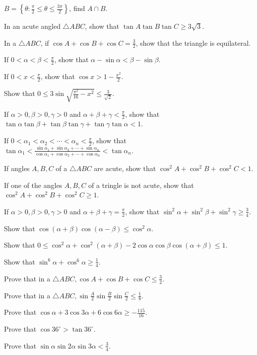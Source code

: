   $B = \left\{\theta: \frac{\pi}{2}\leq \theta\leq \frac{3\pi}{2}\right\}$, find $A\cap B$.
\item In an acute angled $\triangle ABC$, show that $\tan A\tan B\tan C\geq 3\sqrt{3}$.
\item In a $\triangle ABC$, if $\cos A + \cos B + \cos C = \frac{3}{2}$, show that the triangle is
  equilateral.
\item If $0 < \alpha < \beta < \frac{\pi}{2}$, show that $\alpha - \sin\alpha < \beta - \sin\beta$.
\item If $0 < x < \frac{\pi}{2}$, show that $\cos x > 1 - \frac{x^2}{2}$.
\item Show that $0\leq 3\sin\sqrt{\frac{\pi^2}{16} - x^2}\leq \frac{3}{\sqrt{2}}$.
\item If $\alpha > 0, \beta > 0, \gamma > 0$ and $\alpha + \beta + \gamma < \frac{\pi}{2}$, show that
  $\tan\alpha\tan\beta + \tan\beta\tan\gamma + \tan\gamma\tan\alpha < 1$.
\item If $0 < \alpha_1 < \alpha_2 < \cdots < \alpha_n < \frac{\pi}{2}$, show that $\tan\alpha_1
  < \frac{\sin\alpha_1 + \sin\alpha_2 + \cdots + \sin\alpha_n}{\cos\alpha_1 + \cos\alpha_2 + \cdots
    + \cos\alpha_n} < \tan\alpha_n$.
\item If angles $A, B, C$ of a $\triangle ABC$ are acute, show that $\cos^2A + \cos^2B + \cos^2C < 1$.
\item If one of the angles $A, B, C$ of a tringle is not acute, show that $\cos^2A + \cos^2B + \cos^2C \geq
  1$.
\item If $\alpha > 0, \beta > 0, \gamma > 0$ and $\alpha + \beta + \gamma = \frac{\pi}{2}$, show that
  $\sin^2\alpha + \sin^2\beta + \sin^2\gamma \geq \frac{3}{4}$.
\item Show that $\cos(\alpha + \beta)\cos(\alpha - \beta)\leq \cos^2\alpha$.
\item Show that $0\leq \cos^2\alpha + \cos^2(\alpha + \beta) - 2\cos\alpha\cos\beta\cos(\alpha + \beta) \leq
  1$.
\item Show that $\sin^6\alpha + \cos^6\alpha \geq \frac{1}{4}$.
\item Prove that in a $\triangle ABC, \cos A + \cos B + \cos C\leq \frac{3}{2}$.
\item Prove that in a $\triangle ABC, \sin\frac{A}{2}\sin\frac{B}{2}\sin\frac{C}{2}\leq \frac{1}{8}$.
\item Prove that $\cos\alpha + 3\cos3\alpha + 6\cos6\alpha\geq -\frac{115}{16}$.
\item Prove that $\cos36^\circ > \tan36^\circ$.
\item Prove that $\sin\alpha\sin2\alpha\sin3\alpha < \frac{3}{4}$.
